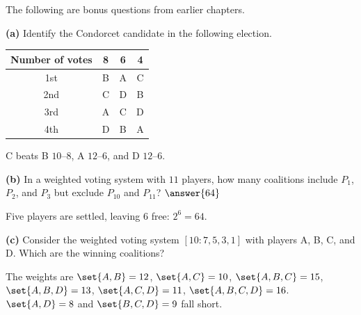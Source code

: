 \documentclass[12pt]{ximera}
\begin{document}
\begin{problem}
The following are bonus questions from earlier chapters.

\begin{prompt}
\textbf{(a)} Identify the Condorcet candidate in the following election.
\begin{center}
\begin{tabular}{c|ccc}
Number of votes & 8 & 6 & 4\\\hline
1st & B & A & C\\
2nd & C & D & B\\
3rd & A & C & D\\
4th & D & B & A
\end{tabular}
\end{center}

\begin{multipleChoice}
\end{multipleChoice}

\begin{feedback}
C beats B $10$--$8$, A $12$--$6$, and D $12$--$6$.
\end{feedback}
\end{prompt}

\begin{prompt}
\textbf{(b)} In a weighted voting system with $11$ players, how many coalitions include
$P_1$, $P_2$, and $P_3$ but exclude $P_{10}$ and $P_{11}$? $\answer{64}$

\begin{feedback}
Five players are settled, leaving $6$ free: $2^6=64$.
\end{feedback}
\end{prompt}

\begin{prompt}
\textbf{(c)} Consider the weighted voting system $[10:7,5,3,1]$ with players A, B, C, and
D. Which are the winning coalitions?

\begin{selectAll}
\end{selectAll}

\begin{feedback}
The weights are $\set{A,B}=12$, $\set{A,C}=10$, $\set{A,B,C}=15$, $\set{A,B,D}=13$,
$\set{A,C,D}=11$, $\set{A,B,C,D}=16$. $\set{A,D}=8$ and $\set{B,C,D}=9$ fall short.
\end{feedback}
\end{prompt}


\end{problem}
\end{document}
